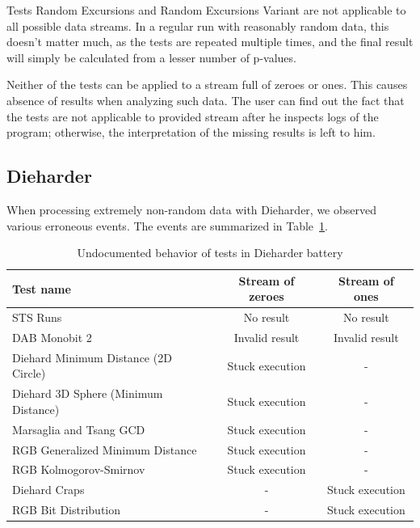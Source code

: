 \documentclass[
  digital,  	%
  color,		%
  oneside,   	%
  12pt,
  nocover,
  notable,
  nolof,
  nolot,
]{fithesis3}
\begin{document}
Tests Random Excursions and Random Excursions Variant are not applicable to all possible data streams. In a regular run with reasonably random data, this doesn't matter much, as the tests are repeated multiple times, and the final result will simply be calculated from a lesser number of p-values. 

Neither of the tests can be applied to a stream full of zeroes or ones. This causes absence of results when analyzing such data. The user can find out the fact that the tests are not applicable to provided stream after he inspects logs of the program; otherwise, the interpretation of the missing results is left to him.

\subsection*{Dieharder}
When processing extremely non-random data with Dieharder, we observed various erroneous events. The events are summarized in Table~\ref{tab:dieharder_errors}. 

\begin{table}[h!]
\begin{nomar}
\centering
\begin{tabular}{ l || c | c }
\textbf{Test name}                   & \textbf{Stream of zeroes} & \textbf{Stream of ones} \\ \hline \hline
STS Runs                             & No result                & No result                \\ \hline
DAB Monobit 2 						 & Invalid result           & Invalid result           \\ \hline
Diehard Minimum Distance (2D Circle) & Stuck execution          & -                        \\
Diehard 3D Sphere (Minimum Distance) & Stuck execution          & -                        \\
Marsaglia and Tsang GCD              & Stuck execution          & -                        \\
RGB Generalized Minimum Distance     & Stuck execution          & -                        \\
RGB Kolmogorov-Smirnov               & Stuck execution          & -                        \\  
Diehard Craps                        & -                        & Stuck execution          \\
RGB Bit Distribution                 & -                        & Stuck execution          \\
\end{tabular}
\end{nomar}
\caption{Undocumented behavior of tests in Dieharder battery}
\label{tab:dieharder_errors}
\end{table}
\end{document}
